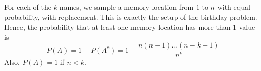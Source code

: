 For each of the $k$ names, we sample a memory location from $1$ to $n$ with equal probability, with replacement. This is exactly the setup of the birthday problem. Hence, the probability that at least one memory location has more than $1$ value is $$P(A) = 1 - P(A^{c}) = 1 - \frac{n(n-1) \dots (n-k+1)}{n^{k}}$$ Also, $P(A) = 1$ if $n < k$.